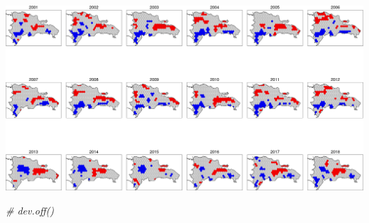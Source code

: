 \documentclass[10pt,landscape,a3paper]{article}
\newenvironment{Shaded}{\begin{snugshade}}{\end{snugshade}}
\newcommand{\CommentTok}[1]{\textcolor[rgb]{0.56,0.35,0.01}{\textit{#1}}}
\begin{document}
\begin{center}\includegraphics{img/modelling/aa-lisa-maps-2} \end{center}

\begin{Shaded}
\begin{Highlighting}[]
\CommentTok{\# dev.off()}


\end{Highlighting}
\end{Shaded}
\end{document}
